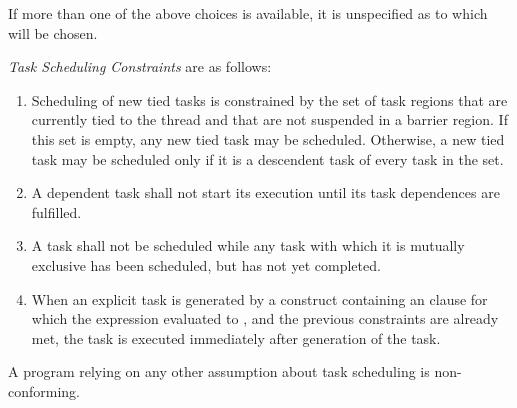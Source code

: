 If more than one of the above choices is available, it is unspecified as 
to which will be chosen.

\emph{Task Scheduling Constraints} are as follows:

\begin{enumerate}
\item Scheduling of new tied tasks is constrained by the set of task regions 
      that are currently tied to the thread and that are not suspended in a
      barrier region. If this set is empty, any new tied task may be
      scheduled. Otherwise, a new tied task may be scheduled only if it is a 
      descendent task of every task in the set.

\item A dependent task shall not start its execution until its task dependences are fulfilled.

\item A task shall not be scheduled while any task with which it is
      mutually exclusive has been scheduled, but has not yet completed.

\item When an explicit task is generated by a construct containing an  
      clause for which the expression evaluated to , and the previous 
      constraints are already met, the task is executed immediately after generation 
      of the task.
\end{enumerate}

A program relying on any other assumption about task scheduling is non-conforming.

